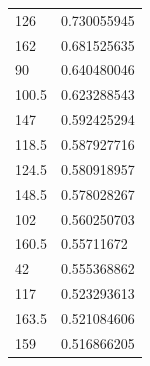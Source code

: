 \begin{longtable}{|l|l|}
 \rowcolor[HTML]{F8FF00} 
 126                                                     & 0.730055945                                                   \\
 \rowcolor[HTML]{F8FF00} 
 162                                                     & 0.681525635                                                   \\
 \rowcolor[HTML]{F8FF00} 
 90                                                      & 0.640480046                                                   \\
 \rowcolor[HTML]{F8FF00} 
 100.5                                                   & 0.623288543                                                   \\
 \rowcolor[HTML]{F8FF00} 
 147                                                     & 0.592425294                                                   \\
 \rowcolor[HTML]{F8FF00} 
 118.5                                                   & 0.587927716                                                   \\
 \rowcolor[HTML]{F8FF00} 
 124.5                                                   & 0.580918957                                                   \\
 \rowcolor[HTML]{F8FF00} 
 148.5                                                   & 0.578028267                                                   \\
 \rowcolor[HTML]{F8FF00} 
 102                                                     & 0.560250703                                                   \\
 \rowcolor[HTML]{F8FF00} 
 160.5                                                   & 0.55711672                                                    \\
 \rowcolor[HTML]{F8FF00} 
 42                                                      & 0.555368862                                                   \\
 \rowcolor[HTML]{F8FF00} 
 117                                                     & 0.523293613                                                   \\
 \rowcolor[HTML]{F8FF00} 
 163.5                                                   & 0.521084606                                                   \\
 \rowcolor[HTML]{F8FF00} 
 159                                                     & 0.516866205                                                   \\

\end{longtable}
